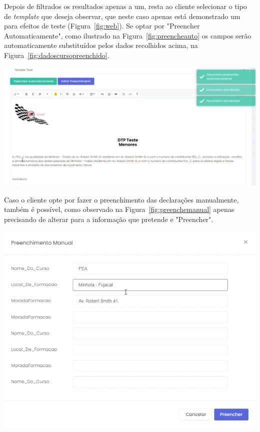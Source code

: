 Depois de filtrados os resultados apenas a um, resta ao cliente selecionar o tipo de \textit{template} que deseja observar, que neste caso apenas está demonstrado um para efeitos de teste (Figura~\ref{fig:web}). Se optar por "Preencher Automaticamente", como ilustrado na Figura~\ref{fig:preencheauto} os campos serão automaticamente substituídos pelos dados recolhidos acima, na Figura~\ref{fig:dadoscursopreenchido}.

\begin{center}
        \includegraphics[width=\textwidth,height=\textheight,keepaspectratio]{images/preencheauto.png}
        \label{fig:preencheauto}
\end{center}

Caso o cliente opte por fazer o preenchimento das declarações manualmente, também é possível, como observado na Figura~\ref{fig:preenchemanual} apenas precisando de alterar para a informação que pretende e "Preencher".

\begin{center}
        \includegraphics[width=\textwidth,height=\textheight,keepaspectratio]{images/preenchemanual.png}
        \label{fig:preenchemanual}
\end{center}

